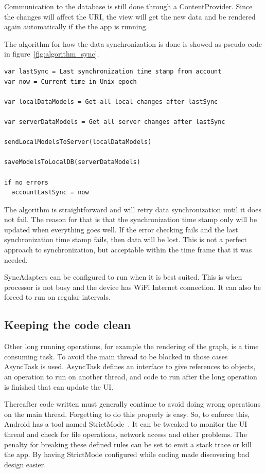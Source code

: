 Communication to the database is still done through a ContentProvider. Since the changes will affect the URI, the view will get the new data and be rendered again automatically if the the app is running. 

The algorithm for how the data synchronization is done is showed as pseudo code in figure~\ref{fig:algorithm_sync}.


\noindent\begin{minipage}{\textwidth}
\begin{lstlisting}[caption={Algorithm for the synchronization flow.}, label={fig:algorithm_sync}]
var lastSync = Last synchronization time stamp from account
var now = Current time in Unix epoch

var localDataModels = Get all local changes after lastSync

var serverDataModels = Get all server changes after lastSync

sendLocalModelsToServer(localDataModels)

saveModelsToLocalDB(serverDataModels)

if no errors
  accountLastSync = now
\end{lstlisting}
\end{minipage}

The algorithm is straightforward and will retry data synchronization until it does not fail. The reason for that is that the synchronization time stamp only will be updated when everything goes well. If the error checking fails and the last synchronization time stamp fails, then data will be lost. 
This is not a perfect approach to synchronization, but acceptable within the time frame that it was needed. 

SyncAdapters can be configured to run when it is best suited. This is when processor is not busy and the device has WiFi Internet connection. It can also be forced to run on regular intervals.

\subsection{Keeping the code clean}

Other long running operations, for example the rendering of the graph, is a time consuming task. To avoid the main thread to be blocked in those cases AsyncTask is used. AsyncTask defines an interface to give references to objects, an operation to run on another thread, and code to run after the long operation is finished that can update the UI. 

Thereafter code written must generally continue to avoid doing wrong operations on the main thread. Forgetting to do this properly is easy. So, to enforce this, Android has a tool named StrictMode~\cite{androidStrictMode}. It can be tweaked to monitor the UI thread and check for file operations, network access and other problems. The penalty for breaking these defined rules can be set to emit a stack trace or kill the app. By having StrictMode configured while coding made discovering bad design easier. 

